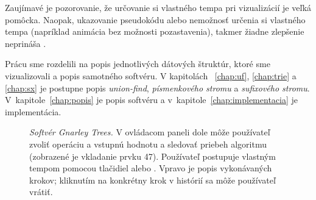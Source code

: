 Zaujímavé je pozorovanie, že určovanie si vlastného tempa pri vizualizácií 
je veľká pomôcka. Naopak, ukazovanie pseudokódu alebo nemožnosť určenia si
vlastného tempa (napríklad animácia bez možnosti pozastavenia), takmer 
žiadne zlepšenie neprináša \citep{shaffer,saraiya}.


Prácu sme rozdelili na popis jednotlivých dátových štruktúr, ktoré sme 
vizualizovali a popis samotného softvéru. V kapitolách~
\ref{chap:uf}, \ref{chap:trie} a \ref{chap:sx} je postupne popis 
\emph{union-find}, \emph{písmenkového stromu} a \emph{sufixového stromu}. 
V~kapitole~\ref{chap:popis} je popis softvéru a 
v~kapitole~\ref{chap:implementacia} je implementácia.
 
\begin{figure}
\centering
{}
\caption{\emph{Softvér Gnarley Trees.} V ovládacom paneli dole môže používateľ
zvoliť operáciu a vstupnú hodnotu a sledovať priebeh algoritmu (zobrazené je vkladanie
prvku 47). Používateľ postupuje vlastným tempom  pomocou tlačidiel  alebo
. Vpravo je popis vykonávaných krokov; kliknutím na konkrétny krok v histórií
sa môže používateľ vrátiť.}
\label{img:historia} 
\end{figure}
